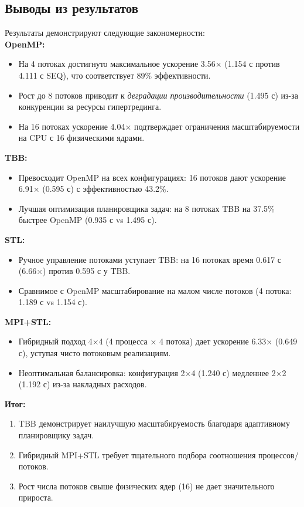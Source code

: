 \documentclass[a4paper,12pt]{article}
\begin{document}
\subsection{Выводы из результатов}

Результаты демонстрируют следующие закономерности: \\

\textbf{OpenMP:} 
\begin{itemize}
\item На 4 потоках достигнуто максимальное ускорение 3.56× (1.154 с против 4.111 с SEQ), что соответствует 89\% эффективности.
\item Рост до 8 потоков приводит к \textit{деградации производительности} (1.495 с) из-за конкуренции за ресурсы гипертрединга.
\item На 16 потоках ускорение 4.04× подтверждает ограничения масштабируемости на CPU с 16 физическими ядрами.
\end{itemize}

\textbf{TBB:} 
\begin{itemize}
\item Превосходит OpenMP на всех конфигурациях: 16 потоков дают ускорение 6.91× (0.595 с) с эффективностью 43.2\%.
\item Лучшая оптимизация планировщика задач: на 8 потоках TBB на 37.5\% быстрее OpenMP (0.935 с vs 1.495 с).
\end{itemize}

\textbf{STL:} 
\begin{itemize}
\item Ручное управление потоками уступает TBB: на 16 потоках время 0.617 с (6.66×) против 0.595 с у TBB.
\item Сравнимое с OpenMP масштабирование на малом числе потоков (4 потока: 1.189 с vs 1.154 с).
\end{itemize}

\textbf{MPI+STL:} 
\begin{itemize}
\item Гибридный подход 4×4 (4 процесса × 4 потока) дает ускорение 6.33× (0.649 с), уступая чисто потоковым реализациям.
\item Неоптимальная балансировка: конфигурация 2×4 (1.240 с) медленнее 2×2 (1.192 с) из-за накладных расходов.
\end{itemize}

\textbf{Итог:}
\begin{enumerate}
\item TBB демонстрирует наилучшую масштабируемость благодаря адаптивному планировщику задач.
\item Гибридный MPI+STL требует тщательного подбора соотношения процессов/потоков.
\item Рост числа потоков свыше физических ядер (16) не дает значительного прироста.
\end{enumerate}
\end{document}

